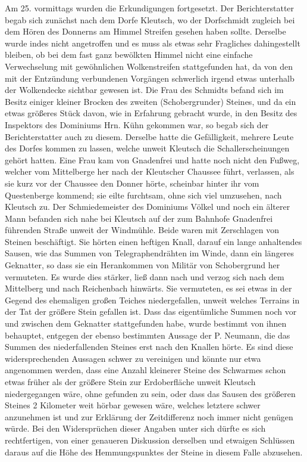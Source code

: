 \documentclass[a4paper, 11pt, oneside]{article}
\begin{document}
Am 25. vormittags wurden die Erkundigungen fortgesetzt. Der Berichterstatter begab sich zunächst nach dem Dorfe Kleutsch, wo der Dorfschmidt zugleich bei dem Hören des Donnerns am Himmel Streifen gesehen haben sollte. Derselbe wurde indes nicht angetroffen und es muss als etwas sehr Fragliches dahingestellt bleiben, ob bei dem fast ganz bewölkten Himmel nicht eine einfache Verwechselung mit gewöhnlichen Wolkenstreifen stattgefunden hat, da von den mit der Entzündung verbundenen Vorgängen schwerlich irgend etwas unterhalb der Wolkendecke sichtbar gewesen ist. Die Frau des Schmidts befand sich im Besitz einiger kleiner Brocken des zweiten (Schobergrunder) Steines, und da ein etwas größeres Stück davon, wie in Erfahrung gebracht wurde, in den Besitz des Inspektors des Dominiums Hrn. Kühn gekommen war, so begab sich der Berichterstatter auch zu diesem. Derselbe hatte die Gefälligkeit, mehrere Leute des Dorfes kommen zu lassen, welche unweit Kleutsch die Schallerscheinungen gehört hatten. Eine Frau kam von Gnadenfrei und hatte noch nicht den Fußweg, welcher vom Mittelberge her nach der Kleutscher Chaussee führt, verlassen, als sie kurz vor der Chaussee den Donner hörte, scheinbar hinter ihr vom Questenberge kommend; sie eilte furchtsam, ohne sich viel umzusehen, nach Kleutsch zu. Der Schmiedemeister des Dominiums Völkel und noch ein älterer Mann befanden sich nahe bei Kleutsch auf der zum Bahnhofe Gnadenfrei führenden Straße unweit der Windmühle. Beide waren mit Zerschlagen von Steinen beschäftigt. Sie hörten einen heftigen Knall, darauf ein lange anhaltendes Sausen, wie das Summen von Telegraphendrähten im Winde, dann ein längeres Geknatter, so dass sie ein Herankommen von Militär von Schobergrund her vermuteten. Es wurde dies stärker, ließ dann nach und verzog sich nach dem Mittelberg und nach Reichenbach hinwärts. Sie vermuteten, es sei etwas in der Gegend des ehemaligen großen Teiches niedergefallen, unweit welches Terrains in der Tat der größere Stein gefallen ist. Dass das eigentümliche Summen noch vor und zwischen dem Geknatter stattgefunden habe, wurde bestimmt von ihnen behauptet, entgegen der ebenso bestimmten Aussage der P. Neumann, die das Summen des niederfallenden Steines erst nach den Knallen hörte. Es sind diese widersprechenden Aussagen schwer zu vereinigen und könnte nur etwa angenommen werden, dass eine Anzahl kleinerer Steine des Schwarmes schon etwas früher als der größere Stein zur Erdoberfläche unweit Kleutsch niedergegangen wäre, ohne gefunden zu sein, oder dass das Sausen des größeren Steines 2 Kilometer weit hörbar gewesen wäre, welches letztere schwer anzunehmen ist und zur Erklärung der Zeitdifferenz noch immer nicht genügen würde. Bei den Widersprüchen dieser Angaben unter sich dürfte es sich rechtfertigen, von einer genaueren Diskussion derselben und etwaigen Schlüssen daraus auf die Höhe des Hemmungspunktes der Steine in diesem Falle abzusehen.
\end{document}
